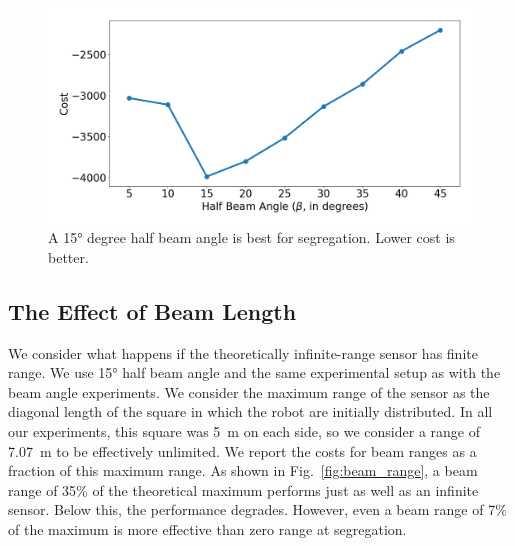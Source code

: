 \documentclass[letterpaper, 10 pt, conference]{ieeeconf}
\begin{document}
\begin{figure}[t]
  \centering
  \includegraphics[width=1\linewidth]{./images/beam_angle.png}
  \caption{A \ang{15} degree half beam angle is best for segregation. Lower cost is better.}
  \label{fig:beam_angle}
\end{figure}

\subsection{The Effect of Beam Length} \label{section:beam_range}

We consider what happens if the theoretically infinite-range sensor has finite
range. We use \ang{15} half beam angle and the same experimental setup as with
the beam angle experiments. We consider the maximum range of the sensor as the
diagonal length of the square in which the robot are initially distributed. In
all our experiments, this square was \SI{5}{\meter} on each side, so we consider
a range of \SI{7.07}{\meter} to be effectively unlimited. We report the costs
for beam ranges as a fraction of this maximum range. As shown in
Fig.~\ref{fig:beam_range}, a beam range of 35\% of the theoretical maximum
performs just as well as an infinite sensor. Below this, the performance
degrades. However, even a beam range of 7\% of the maximum is more effective
than zero range at segregation.
\end{document}
